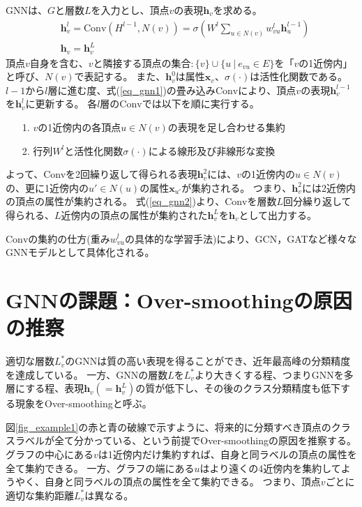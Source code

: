 \documentclass[a4j,twocolumn]{jsarticle}
\begin{document}
GNNは、$G$と層数$L$を入力とし、頂点$v$の表現$\bm{h}_v$を求める。\vspace{-6mm}
\begin{align}
  & \bm{h}_v^l = \text{Conv}(H^{l-1}, N(v)) = \sigma\left( W^l \sum_{u\in N(v)} w_{vu}^l\bm{h}_u^{l-1} \right) \label{eq_gnn1} \\
  & \bm{h}_v   = \bm{h}_v^L \label{eq_gnn2}
\end{align}
頂点$v$自身を含む、$v$と隣接する頂点の集合$:\{v\} \cup \{u ~|~ e_{vu} \in E\}$を「$v$の1近傍内」と呼び、$N(v)$で表記する。
また、$\bm{h}_v^0$は属性$\bm{x}_v$、$\sigma(\cdot)$は活性化関数である。
$l-1$から$l$層に進む度、式(\ref{eq_gnn1})の畳み込み$\text{Conv}$により、頂点$v$の表現$\bm{h}_v^{l-1}$を$\bm{h}_v^{l}$に更新する。
各$l$層の$\text{Conv}$では以下を順に実行する。\vspace{-2mm}
\begin{itemize}
  \item[1.] $v$の1近傍内の各頂点$u\in N(v)$の表現を足し合わせる集約
  \item[2.] 行列$W^l$と活性化関数$\sigma(\cdot)$による線形及び非線形な変換\vspace{-2mm}
\end{itemize}
よって、Convを2回繰り返して得られる表現$\bm{h}_v^2$には、$v$の1近傍内の$u\in N(v)$の、更に1近傍内の$u' \in N(u)$の属性$\bm{x}_{u'}$が集約される。
つまり、$\bm{h}_v^2$には2近傍内の頂点の属性が集約される。
式(\ref{eq_gnn2})より、$\text{Conv}$を層数$L$回分繰り返して得られる、$L$近傍内の頂点の属性が集約された$\bm{h}_v^L$を$\bm{h}_v$として出力する。

$\text{Conv}$の集約の仕方(重み$w_{vu}^l$の具体的な学習手法)により、GCN\cite{Kipf}，GAT\cite{Velickovic}など様々なGNNモデルとして具体化される。

\section{GNNの課題：Over-smoothingの原因の推察}
\label{sec_over_smoothing}
\vspace{-1mm}

適切な層数$L_v^*$のGNNは質の高い表現を得ることができ、近年最高峰の分類精度を達成している\cite{Kipf}\cite{Velickovic}。
一方、GNNの層数$L$を$L_v^*$より大きくする程、つまりGNNを多層にする程、表現$\bm{h}_v(=\bm{h}_v^L)$の質が低下し、その後のクラス分類精度も低下する現象をOver-smoothingと呼ぶ。

図\ref{fig_example1}の赤と青の破線で示すように、将来的に分類すべき頂点のクラスラベルが全て分かっている、という前提でOver-smoothingの原因を推察する。
グラフの中心にある$v$は1近傍内だけ集約すれば、自身と同ラベルの頂点の属性を全て集約できる。
一方、グラフの端にある$u$はより遠くの4近傍内を集約してようやく、自身と同ラベルの頂点の属性を全て集約できる。
つまり、頂点$v$ごとに適切な集約距離$L_v^*$は異なる。
\end{document}
